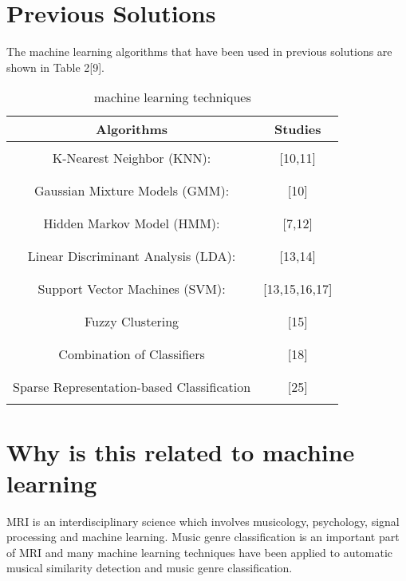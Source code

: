 \documentclass{article} %
\begin{document}
\section{Previous Solutions}
The machine learning algorithms that have been used in previous solutions are shown in Table 2[9].
\begin{table}[H]
	\caption{machine learning techniques}
	\label{machine learning techniques}
	\begin{center}
		\begin{tabular}{c|c}
			\multicolumn{1}{c}{\bf Algorithms}   &\multicolumn{1}{c}{\bf Studies} 
			\\ \hline \\
			K-Nearest Neighbor (KNN):         & [10,11]\\
			 \\ \hline \\
			Gaussian Mixture Models (GMM):             & [10]\\
			\\ \hline \\
			Hidden Markov Model (HMM):            & [7,12]\\
			 \\ \hline \\
			Linear Discriminant Analysis (LDA): & [13,14]\\
			\\ \hline \\
			Support Vector Machines (SVM): & [13,15,16,17]\\
			\\ \hline \\
            Fuzzy Clustering      & [15]\\
             \\ \hline \\
             Combination of Classifiers & [18]\\
             \\ \hline \\
             Sparse Representation-based Classification & [25]\\
             \\ \hline
		\end{tabular}
	\end{center}
\end{table}
\section{Why is this related to machine learning}
MRI is an interdisciplinary science which involves musicology, psychology, signal processing and machine learning. Music genre classification is an important part of MRI and many machine learning techniques have been applied to automatic musical similarity detection and music genre classification.
\end{document}
